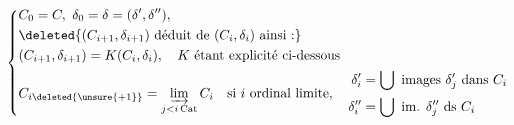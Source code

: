 
\[
\left\{\begin{aligned}
&C_0=C,\ \delta_0=\delta=(\delta',\delta''),\\
&\deleted{(C_{i+1},\delta_{i+1})\text{ déduit de }(C_i,\delta_i)\text{ ainsi :}}\\
&(C_{i+1},\delta_{i+1})=K(C_i,\delta_i),\quad K\text{ étant explicité ci-dessous}\\
&C_{i\deleted{\unsure{+1}}}=\varinjlim_{j<i\,\mathrm{Cat}} C_i\quad\text{si }i\text{ ordinal limite},\quad
\begin{aligned}\delta_i'&=\bigcup\text{ images }\delta_j'\text{ dans } C_i\\
\delta_i''&=\bigcup\text{ im. }\delta_j''\text{ ds }C_i\end{aligned}
\end{aligned}\right.
\]


